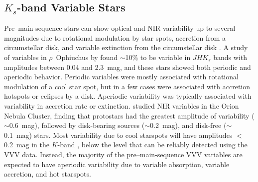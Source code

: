 \documentclass[twocolumn,tighten]{aastex61}
\begin{document}
\subsection{$K_s$-band Variable Stars \label{ksvar.sec}}

Pre--main-sequence stars can show optical and NIR variability up to several magnitudes due to rotational modulation by star spots, accretion from a circumstellar disk, and variable extinction from the circumstellar disk \citep{1945ApJ...102..168J, 1994AJ....108.1906H}. A study of variables in $\rho$~Ophiuchus by \citet{2014ApJS..211....3P} found $\sim$10\% to be variable in $JHK_s$ bands with amplitudes between 0.04 and 2.3~mag, and these stars showed both periodic and aperiodic behavior. Periodic variables were mostly associated with rotational modulation of a cool star spot, but in a few cases were associated with accretion hotspots or eclipses by a disk. Aperiodic variability was typically associated with variability in accretion rate or extinction. \citet{2015AJ....150..132R} studied NIR variables in the Orion Nebula Cluster, finding that protostars had the greatest amplitude of variability ($\sim$0.6~mag), followed by disk-bearing sources ($\sim$0.2~mag), and disk-free ($\sim$0.1~mag) stars. Most variability due to cool starspots will have amplitudes $<$0.2~mag in the $K$-band \citep[e.g.,][]{2001AJ....121.3160C,2013ApJ...773..145W}, below the level that can be reliably detected using the VVV data. Instead, the majority of the pre--main-sequence VVV variables are expected to have aperiodic variability due to variable absorption, variable accretion, and hot starspots. 
\end{document}
